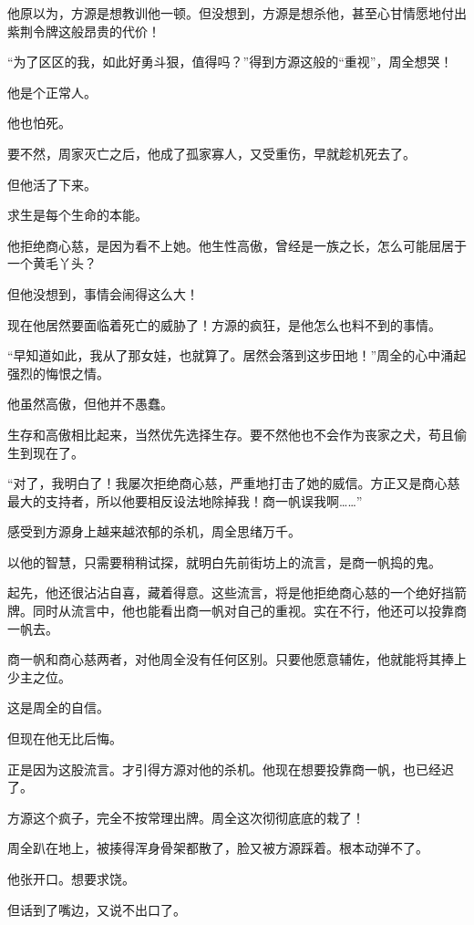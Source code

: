 
\begin{this_body}

他原以为，方源是想教训他一顿。但没想到，方源是想杀他，甚至心甘情愿地付出紫荆令牌这般昂贵的代价！

“为了区区的我，如此好勇斗狠，值得吗？”得到方源这般的“重视”，周全想哭！

他是个正常人。

他也怕死。

要不然，周家灭亡之后，他成了孤家寡人，又受重伤，早就趁机死去了。

但他活了下来。

求生是每个生命的本能。

他拒绝商心慈，是因为看不上她。他生性高傲，曾经是一族之长，怎么可能屈居于一个黄毛丫头？

但他没想到，事情会闹得这么大！

现在他居然要面临着死亡的威胁了！方源的疯狂，是他怎么也料不到的事情。

“早知道如此，我从了那女娃，也就算了。居然会落到这步田地！”周全的心中涌起强烈的悔恨之情。

他虽然高傲，但他并不愚蠢。

生存和高傲相比起来，当然优先选择生存。要不然他也不会作为丧家之犬，苟且偷生到现在了。

“对了，我明白了！我屡次拒绝商心慈，严重地打击了她的威信。方正又是商心慈最大的支持者，所以他要相反设法地除掉我！商一帆误我啊……”

感受到方源身上越来越浓郁的杀机，周全思绪万千。

以他的智慧，只需要稍稍试探，就明白先前街坊上的流言，是商一帆捣的鬼。

起先，他还很沾沾自喜，藏着得意。这些流言，将是他拒绝商心慈的一个绝好挡箭牌。同时从流言中，他也能看出商一帆对自己的重视。实在不行，他还可以投靠商一帆去。

商一帆和商心慈两者，对他周全没有任何区别。只要他愿意辅佐，他就能将其捧上少主之位。

这是周全的自信。

但现在他无比后悔。

正是因为这股流言。才引得方源对他的杀机。他现在想要投靠商一帆，也已经迟了。

方源这个疯子，完全不按常理出牌。周全这次彻彻底底的栽了！

周全趴在地上，被揍得浑身骨架都散了，脸又被方源踩着。根本动弹不了。

他张开口。想要求饶。

但话到了嘴边，又说不出口了。


\end{this_body}
